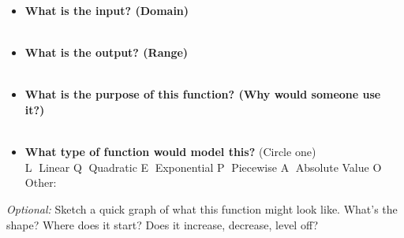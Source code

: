 \documentclass[12pt]{article}
\begin{document}
\begin{itemize}
  \item \textbf{What is the input? (Domain)} \\[0.5em]
  \underline{\hspace{\textwidth}}\\[1em]

  \item \textbf{What is the output? (Range)} \\[0.5em]
  \underline{\hspace{\textwidth}}\\[1em]

  \item \textbf{What is the purpose of this function? (Why would someone use it?)} \\[0.5em]
  \underline{\hspace{\textwidth}}\\[1em]

  \item \textbf{What type of function would model this?} (Circle one) \\[0.5em]
  \textcircled{\scriptsize L} Linear \quad
  \textcircled{\scriptsize Q} Quadratic \quad
  \textcircled{\scriptsize E} Exponential \quad
  \textcircled{\scriptsize P} Piecewise \quad
  \textcircled{\scriptsize A} Absolute Value \quad
  \textcircled{\scriptsize O} Other: \underline{\hspace{1.5in}}

\end{itemize}

\vspace{2em}

\textit{Optional:} Sketch a quick graph of what this function might look like. What’s the shape? Where does it start? Does it increase, decrease, level off?

\vspace{2em}
\end{document}
